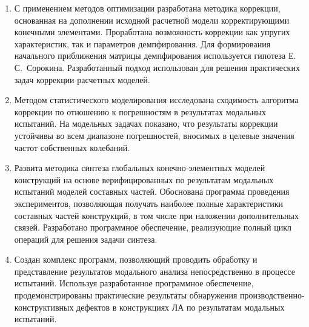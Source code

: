 
\begin{enumerate}
	\item С применением методов оптимизации разработана методика коррекции, основанная на дополнении исходной расчетной модели корректирующими конечными элементами. Проработана возможность коррекции как упругих характеристик, так и параметров демпфирования. Для формирования начального приближения матрицы демпфирования используется гипотеза Е.\,С.~Сорокина. Разработанный подход использован для решения практических задач коррекции  расчетных моделей.
	\item Методом статистического моделирования исследована сходимость алгоритма коррекции по отношению к погрешностям в результатах модальных испытаний. На модельных задачах показано, что результаты коррекции устойчивы во всем диапазоне погрешностей, вносимых в целевые значения частот собственных колебаний.
	\item Развита методика синтеза глобальных конечно-элементных моделей конструкций на основе верифицированных по результатам модальных испытаний моделей составных частей. Обоснована программа проведения экспериментов, позволяющая получать наиболее полные характеристики составных частей конструкций, в том числе при наложении дополнительных связей. Разработано программное обеспечение, реализующие полный цикл операций для решения задачи синтеза.
	\item Создан комплекс программ, позволяющий проводить обработку и представление результатов модального анализа непосредственно в процессе испытаний. Используя разработанное программное обеспечение, продемонстрированы практические результаты обнаружения производственно-конструктивных дефектов в конструкциях ЛА по результатам модальных испытаний.
\end{enumerate}

